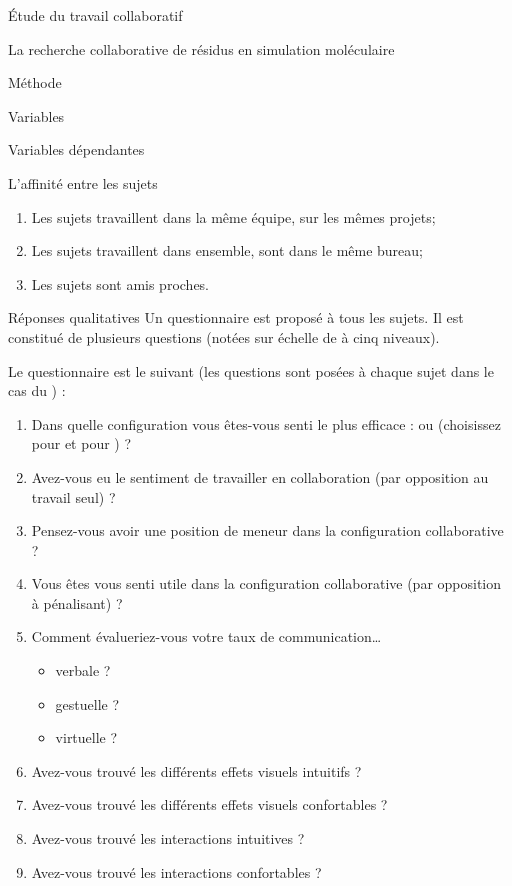 \documentclass[myfrancais]{mythesis}
\begin{document}
\begin{mypart}{Étude du travail collaboratif}
\begin{mychapter}{La recherche collaborative de résidus en simulation moléculaire}
\begin{mysection}{Méthode}
\begin{mysubsection}{Variables}
\begin{mysubsubsection}{Variables dépendantes}
\begin{myparagraph}{ L'affinité entre les sujets}
\begin{enumerate}
								\item Les sujets travaillent dans la même équipe, sur les mêmes projets;
								\item Les sujets travaillent dans ensemble, sont dans le même bureau;
								\item Les sujets sont amis proches.
							\end{enumerate}
						\end{myparagraph}
						\begin{myparagraph}{ Réponses qualitatives}
							Un questionnaire est proposé à tous les sujets.
							Il est constitué de plusieurs questions (notées sur échelle de  à cinq niveaux).

							Le questionnaire est le suivant (les questions sont posées à chaque sujet dans le cas du ) :
							\begin{enumerate}
								\item Dans quelle configuration vous êtes-vous senti le plus efficace :  ou  (choisissez  pour  et  pour ) ?
								\item Avez-vous eu le sentiment de travailler en collaboration (par opposition au travail seul) ?
								\item Pensez-vous avoir une position de meneur dans la configuration collaborative ?
								\item Vous êtes vous senti utile dans la configuration collaborative (par opposition à pénalisant) ?
								\item Comment évalueriez-vous votre taux de communication\dots{}
									\begin{itemize}
										\item verbale ?
										\item gestuelle ?
										\item virtuelle ?
									\end{itemize}
								\item Avez-vous trouvé les différents effets visuels intuitifs ?
								\item Avez-vous trouvé les différents effets visuels confortables ?
								\item Avez-vous trouvé les interactions intuitives ?
								\item Avez-vous trouvé les interactions confortables ?
							\end{enumerate}


\end{myparagraph}
\end{mysubsubsection}
\end{mysubsection}
\end{mysection}
\end{mychapter}
\end{mypart}
\end{document}
